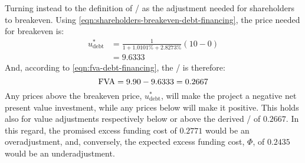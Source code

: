 \documentclass[main.tex]{subfiles}
\begin{document}
        Turning instead to the definition of \FVA/ as the adjustment needed for shareholders to breakeven.
        Using \cref{eqn:shareholders-breakeven-debt-financing}, the price needed for breakeven is:
            \begin{align}
                    u^{\ast}_{\text{debt}} 
                &=
                    \frac{
                        1
                    }{
                        1 + 1.0101\% + 2.8273\%
                    }
                    \left(
                        10
                        -
                        0
                    \right)
                \nonumber \\
                &=
                    9.6333
            \end{align}
        And, according to \cref{eqn:fva-debt-financing}, the \FVA/ is therefore:
            \begin{equation}
                    \FVA/ 
                =
                    9.90 - 9.6333
                =
                    0.2667
            \end{equation}
        Any prices above the breakeven price, $u^{\ast}_{\text{debt}}$, 
        will make the project a negative net present value investment, while any prices below will make it positive. 
        This holds also for value adjustments respectively below or above the derived \FVA/ of $0.2667$.
        In this regard, the promised excess funding cost of $0.2771$ would be an overadjustment,
        and, conversely, the expected excess funding cost, $\Phi$, of $0.2435$ would be an underadjustment.
\end{document}
